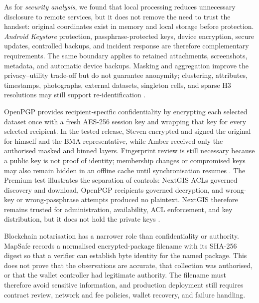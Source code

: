 \documentclass[]{interact}
\begin{document}
As for \textit{security analysis}, we found that local processing reduces unnecessary disclosure to remote services, but it does not remove the need to trust the handset: original coordinates exist in memory and local storage before protection. \textit{Android Keystore} protection, passphrase-protected keys, device encryption, secure updates, controlled backups, and incident response are therefore complementary requirements. The same boundary applies to retained attachments, screenshots, metadata, and automatic device backups. Masking and aggregation improve the privacy--utility trade-off but do not guarantee anonymity; clustering, attributes, timestamps, photographs, external datasets, singleton cells, and sparse H3 resolutions may still support re-identification \citep{kessler2018geoprivacy,zhang2022rehumanize,cassa2008re,zimmerman2008quantifying}.

OpenPGP provides recipient-specific confidentiality by encrypting each selected dataset once with a fresh AES-256 session key and wrapping that key for every selected recipient. In the tested release, Steven encrypted and signed the original for himself and the BMA representative, while Amber received only the authorised masked and binned layers. Fingerprint review is still necessary because a public key is not proof of identity; membership changes or compromised keys may also remain hidden in an offline cache until synchronisation resumes \citep{wouters2024openpgp}. The Premium test illustrates the separation of controls: NextGIS ACLs governed discovery and download, OpenPGP recipients governed decryption, and wrong-key or wrong-passphrase attempts produced no plaintext. NextGIS therefore remains trusted for administration, availability, ACL enforcement, and key distribution, but it does not hold the private keys \citep{nextgis2026permissions,wouters2024openpgp}.

Blockchain notarisation has a narrower role than confidentiality or authority. MapSafe records a normalised encrypted-package filename with its SHA-256 digest so that a verifier can establish byte identity for the named package. This does not prove that the observations are accurate, that collection was authorised, or that the wallet controller had legitimate authority. The filename must therefore avoid sensitive information, and production deployment still requires contract review, network and fee policies, wallet recovery, and failure handling.
\end{document}

